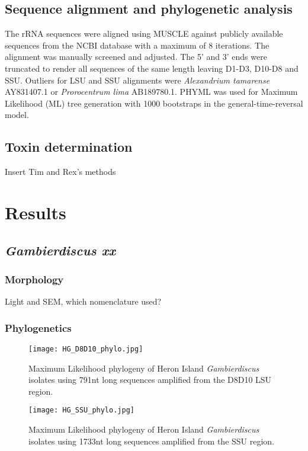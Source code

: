 \documentclass[12pt]{article}
\begin{document}
\subsection{Sequence alignment and phylogenetic analysis}
The rRNA sequences were aligned using MUSCLE \cite{edgar2004muscle} against publicly available sequences from the NCBI database with a maximum of 8 iterations. The alignment was manually screened and adjusted. The 5' and 3' ends were truncated to render all sequences of the same length leaving D1-D3, D10-D8 and SSU. Outliers for LSU and SSU alignments were \emph{Alexandrium tamarense} AY831407.1 or \emph{Prorocentrum lima} AB189780.1.
PHYML was used for Maximum Likelihood (ML) tree generation with 1000 bootstraps in the general-time-reversal model. \\

\subsection{Toxin determination}
Insert Tim and Rex's methods

\section{Results}

\subsection{\emph{Gambierdiscus xx}}

\subsubsection{Morphology}
Light and SEM, which nomenclature used?

\subsubsection{Phylogenetics}

\begin{figure} 
\texttt{[image: HG\_D8D10\_phylo.jpg]} 
\caption{Maximum Likelihood phylogeny of Heron Island \textit{Gambierdiscus} isolates using 791nt long sequences amplified from the D8D10 LSU region.} 
\label{fig:HGD8D10}
\end{figure} 
\FloatBarrier 
\newpage

\begin{figure} 
\texttt{[image: HG\_SSU\_phylo.jpg]} 
\caption{Maximum Likelihood phylogeny of Heron Island \textit{Gambierdiscus} isolates using 1733nt long sequences amplified from the SSU region.}
\label{fig:HGSSU} 
\end{figure} 
\FloatBarrier 
\newpage
\end{document}
